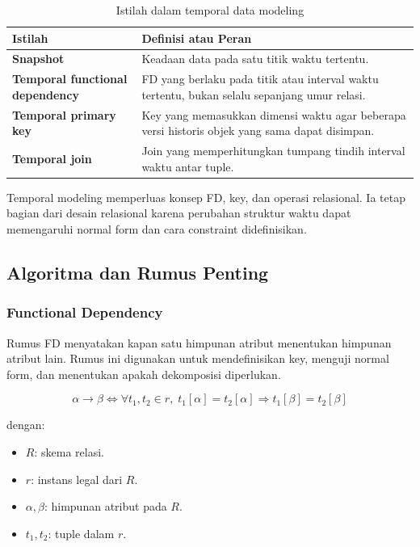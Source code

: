 \begin{table}[H]
\centering
\begin{tabularx}{\textwidth}{|L{0.28\textwidth}|X|}
\hline
\textbf{Istilah} & \textbf{Definisi atau Peran} \\
\hline
\textbf{Snapshot} & Keadaan data pada satu titik waktu tertentu. \\
\hline
\textbf{Temporal functional dependency} & FD yang berlaku pada titik atau interval waktu tertentu, bukan selalu sepanjang umur relasi. \\
\hline
\textbf{Temporal primary key} & Key yang memasukkan dimensi waktu agar beberapa versi historis objek yang sama dapat disimpan. \\
\hline
\textbf{Temporal join} & Join yang memperhitungkan tumpang tindih interval waktu antar tuple. \\
\hline
\end{tabularx}
\caption{Istilah dalam temporal data modeling}
\label{tab:temporal-modeling}
\end{table}

Temporal modeling memperluas konsep FD, key, dan operasi relasional. Ia tetap bagian dari desain relasional karena perubahan struktur waktu dapat memengaruhi normal form dan cara constraint didefinisikan.

\subsection{Algoritma dan Rumus Penting}

\subsubsection{Functional Dependency}

\begin{jawab}
Rumus FD menyatakan kapan satu himpunan atribut menentukan himpunan atribut lain. Rumus ini digunakan untuk mendefinisikan key, menguji normal form, dan menentukan apakah dekomposisi diperlukan.
\end{jawab}

\begin{equation}
    \alpha \rightarrow \beta \iff \forall t_1,t_2 \in r,\; t_1[\alpha]=t_2[\alpha] \Rightarrow t_1[\beta]=t_2[\beta]
    \label{eq:fd-formal}
\end{equation}

dengan:
\begin{itemize}
    \item \(R\): skema relasi.
    \item \(r\): instans legal dari \(R\).
    \item \(\alpha,\beta\): himpunan atribut pada \(R\).
    \item \(t_1,t_2\): tuple dalam \(r\).
\end{itemize}

